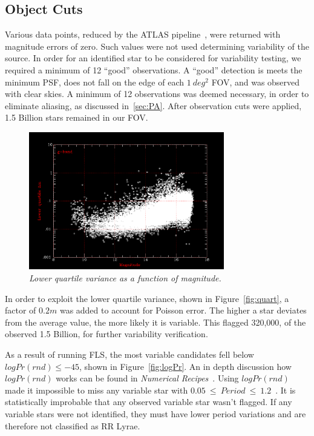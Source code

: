 \documentclass[aps,prb,twocolumn,superscriptaddress]{revtex4-1}
\begin{document}
\subsection{Object Cuts}\label{sec:cuts}

Various data points, reduced by the ATLAS pipeline~\cite{gri}, were returned with magnitude errors of zero.  Such 
values were not used determining variability of the source.  In order for an identified star to be considered for 
variability testing, we required a minimum of 12 ``good'' observations.  A ``good'' detection is meets the minimum 
PSF, does not fall on the edge of each $1~deg^{2}$ FOV, and was observed with clear skies.  A minimum of 12 
observations was deemed necessary, in order to eliminate aliasing, as discussed in~\cref{sec:PA}.  After observation 
cuts were applied, 1.5 Billion stars remained in our FOV.  


\begin{figure}[H]
 \centering
 	\includegraphics[width=3.35in]{figures/NEW/scatter_gfilt_57452_57455.png}
 \caption{\it \small{Lower quartile variance as a function of magnitude.}}
 \label{fig:probrrHPS}
\end{figure}
  In order to exploit the lower quartile variance, shown in Figure~\ref{fig:quart}, a factor of $0.2m$ was added to account for Poisson error.  
The higher a star deviates from the average value, the more likely it is variable.  This flagged 320,000, of the observed 1.5 Billion, for 
further variability verification.


As a result of running FLS, the most variable candidates fell below $logPr(rnd)\leq-45$, shown in Figure~\ref{fig:logPr}.  An in depth discussion how $logPr(rnd)$ works can be found in \textit{Numerical Recipes}~\cite{logPr, Numerical}.  Using $logPr(rnd)$ made it impossible 
to miss any variable star with $0.05~\leq~Period~\leq~1.2$~\cite{AAVSO}.  It is statistically improbable that any observed variable star wasn't flagged.  If any variable stars were not identified, they must have lower period variations and are therefore not classified as RR Lyrae.
\end{document}
